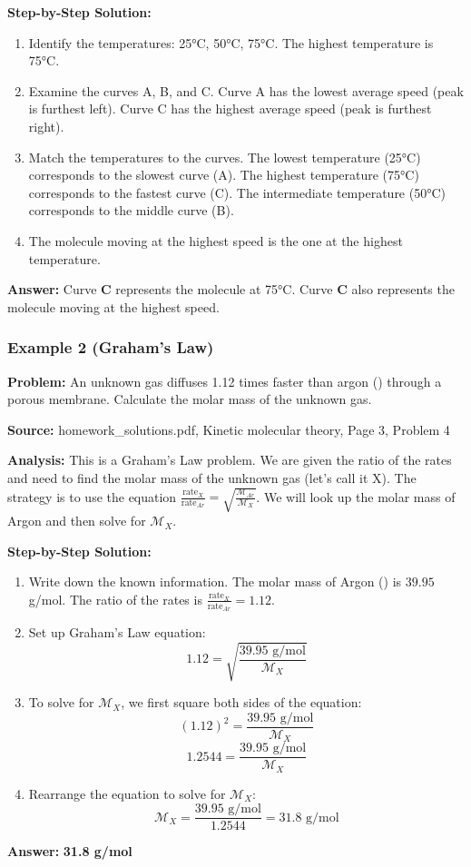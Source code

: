\documentclass{article}
\begin{document}
\textbf{Step-by-Step Solution:}
\begin{enumerate}
    \item Identify the temperatures: 25°C, 50°C, 75°C. The highest temperature is 75°C.
    \item Examine the curves A, B, and C. Curve A has the lowest average speed (peak is furthest left). Curve C has the highest average speed (peak is furthest right).
    \item Match the temperatures to the curves. The lowest temperature (25°C) corresponds to the slowest curve (A). The highest temperature (75°C) corresponds to the fastest curve (C). The intermediate temperature (50°C) corresponds to the middle curve (B).
    \item The molecule moving at the highest speed is the one at the highest temperature.
\end{enumerate}
\textbf{Answer:} Curve \textbf{C} represents the molecule at 75°C. Curve \textbf{C} also represents the molecule moving at the highest speed.

\subsubsection{Example 2 (Graham's Law)}
\textbf{Problem:} An unknown gas diffuses 1.12 times faster than argon () through a porous membrane. Calculate the molar mass of the unknown gas.

\textbf{Source:} homework\_solutions.pdf, Kinetic molecular theory, Page 3, Problem 4

\textbf{Analysis:} This is a Graham's Law problem. We are given the ratio of the rates and need to find the molar mass of the unknown gas (let's call it X). The strategy is to use the equation $\frac{\text{rate}_X}{\text{rate}_{Ar}} = \sqrt{\frac{\mathcal{M}_{Ar}}{\mathcal{M}_X}}$. We will look up the molar mass of Argon and then solve for $\mathcal{M}_X$.

\textbf{Step-by-Step Solution:}
\begin{enumerate}
    \item Write down the known information. The molar mass of Argon () is $39.95$ g/mol. The ratio of the rates is $\frac{\text{rate}_X}{\text{rate}_{Ar}} = 1.12$.
    \item Set up Graham's Law equation:
    \[ 1.12 = \sqrt{\frac{39.95 \text{ g/mol}}{\mathcal{M}_X}} \]
    \item To solve for $\mathcal{M}_X$, we first square both sides of the equation:
    \[ (1.12)^2 = \frac{39.95 \text{ g/mol}}{\mathcal{M}_X} \]
    \[ 1.2544 = \frac{39.95 \text{ g/mol}}{\mathcal{M}_X} \]
    \item Rearrange the equation to solve for $\mathcal{M}_X$:
    \[ \mathcal{M}_X = \frac{39.95 \text{ g/mol}}{1.2544} = 31.8 \text{ g/mol} \]
\end{enumerate}
\textbf{Answer:} \textbf{31.8 g/mol}
\end{document}
